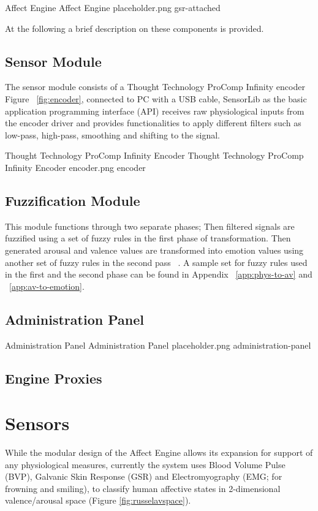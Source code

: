 \documentclass{uofsthesis-cs}
\begin{document}
\img
{Affect Engine}
{Affect Engine}
{placeholder.png}
{gsr-attached}

At the following a brief description on these components is provided.

\subsection{Sensor Module} %
The sensor module consists of a Thought Technology ProComp Infinity encoder ~\cite{tt2013procomp} Figure ~\ref{fig:encoder}, connected to PC with a USB cable, SensorLib as the basic application programming interface (API) receives raw physiological inputs from the encoder driver and provides functionalities to apply different filters such as low-pass, high-pass, smoothing and shifting to the signal.

\img
{Thought Technology ProComp Infinity Encoder}
{Thought Technology ProComp Infinity Encoder}
{encoder.png}
{encoder}

\subsection{Fuzzification Module} \label{subsec:fuzzi} %
This module functions through two separate phases; Then filtered signals are fuzzified using a set of fuzzy rules in the first phase of transformation. Then generated arousal and valence values are transformed into emotion values using another set of fuzzy rules in the second pass ~\cite{mandryk2007fuzzy}. A sample set for fuzzy rules used in the first and the second phase can be found in Appendix ~\ref{app:phys-to-av} and ~\ref{app:av-to-emotion}.



\subsection{Administration Panel}

\img
{Administration Panel}
{Administration Panel}
{placeholder.png}
{administration-panel}

\subsection{Engine Proxies}


\section{Sensors}
While the modular design of the Affect Engine allows its expansion for support of any physiological measures, currently the system uses Blood Volume Pulse (BVP), Galvanic Skin Response (GSR) and Electromyography (EMG; for frowning and smiling), to classify human affective states in 2-dimensional valence/arousal space (Figure \ref{fig:russelavspace}).
\end{document}

